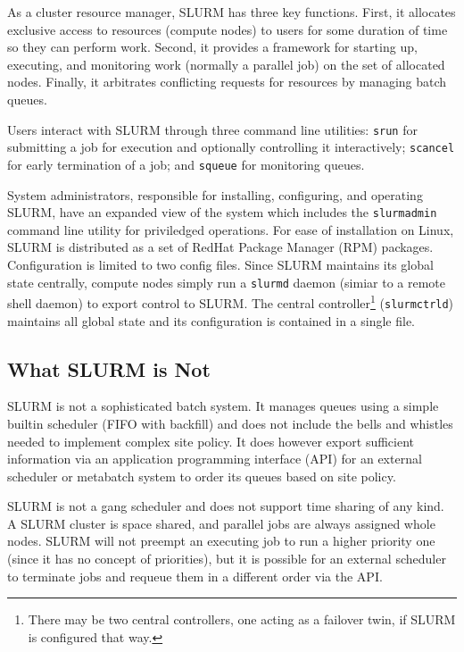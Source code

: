 As a cluster resource manager, SLURM has three key functions.  First,
it allocates exclusive access to resources (compute nodes) to users for 
some duration of time so they can perform work.  Second, it provides 
a framework for starting up, executing, and monitoring work (normally a 
parallel job) on the set of allocated nodes.  Finally, it arbitrates 
conflicting requests for resources by managing batch queues.

Users interact with SLURM through three command line utilities: 
{\tt srun} for submitting a job for execution and optionally controlling it
interactively; 
{\tt scancel} for early termination of a job; 
and {\tt squeue} for monitoring queues.

System administrators, responsible for installing, configuring, and operating 
SLURM, have an expanded view of the system which includes the {\tt slurmadmin} 
command line utility for priviledged operations.  For ease of installation
on Linux, SLURM is distributed as a set of RedHat Package Manager (RPM) 
packages.  Configuration is limited to two config files.  Since SLURM 
maintains its global state centrally, compute nodes simply run a {\tt slurmd} 
daemon (simiar to a remote shell daemon) to export control to SLURM.  The 
central controller\footnote{There may be two central controllers, one acting
as a failover twin, if SLURM is configured that way.}
({\tt slurmctrld}) maintains all global state and its configuration is 
contained in a single file.

\subsection{What SLURM is Not}

SLURM is not a sophisticated batch system.  It manages queues
using a simple builtin scheduler (FIFO with backfill) and does not
include the bells and whistles needed to implement complex site policy.
It does however export sufficient information via an application programming 
interface (API) for an external scheduler or metabatch system to order its
queues based on site policy.

SLURM is not a gang scheduler and does not support time sharing of any kind.
A SLURM cluster is space shared, and parallel jobs are always assigned whole 
nodes.  SLURM will not preempt an executing job to run a higher priority one 
(since it has no concept of priorities), but it is possible for an external 
scheduler to terminate jobs and requeue them in a different order via the API.

